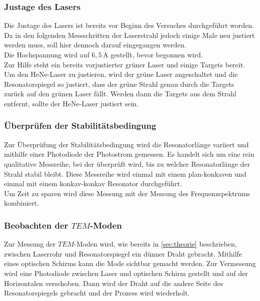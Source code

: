 \subsubsection{Justage des Lasers}

Die Justage des Lasers ist bereits vor Beginn des Versuches durchgeführt worden.
Da in den folgenden Messschritten der Laserstrahl jedoch einige Male neu justiert werden muss, soll hier dennoch darauf eingegangen werden. \\

Die Hochspannung wird auf $6,5 \,\unit{\ampere}$ gestellt, bevor begonnen wird. \\
Zur Hilfe steht ein bereits vorjustierter grüner Laser und einige Targets bereit.
Um den HeNe-Laser zu justieren, wird der grüne Laser angeschaltet und die Resonatorspiegel so justiert, dass der grüne Strahl genau durch die Targets zurück auf den grünen Laser fällt.
Werden dann die Targets aus dem Strahl entfernt, sollte der HeNe-Laser justiert sein.

\subsubsection{Überprüfen der Stabilitätsbedingung}

Zur Überprüfung der Stabilitätsbedingung wird die Resonatorlänge variiert und mithilfe einer Photodiode der Photostrom gemessen. Es handelt sich um eine rein qualitative Messreihe, bei der überprüft wird,
bis zu welcher Resonatorlänge der Strahl stabil bleibt. 
Diese Messreihe wird einmal mit einem plan-konkaven und einmal mit einem konkav-konkav Resonator durchgeführt. \\

Um Zeit zu sparen wird diese Messung mit der Messung des Frequenzspektrums kombiniert.


\subsubsection{Beobachten der $TEM$-Moden}

Zur Messung der $TEM$-Moden wird, wie bereits in \autoref{sec:theorie} beschrieben, zwischen Laserrohr und Resonatorspiegel ein dünner Draht gebracht. 
Mithilfe eines optischen Schirms kann die Mode sichtbar gemacht werden. 
Zur Vermessung wird eine Photodiode zwischen Laser und optischen Schirm gestellt und auf der Horizontalen verschoben.
Dann wird der Draht auf die andere Seite des Resonatorspiegels gebracht und der Prozess wird wiederholt.


